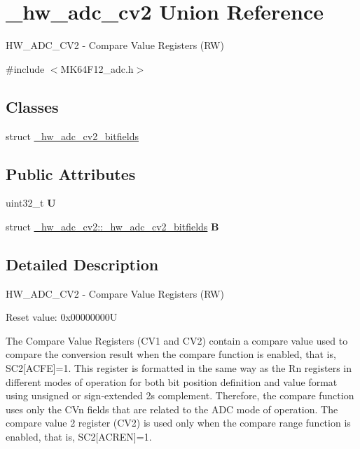\hypertarget{union__hw__adc__cv2}{}\section{\+\_\+hw\+\_\+adc\+\_\+cv2 Union Reference}
\label{union__hw__adc__cv2}


H\+W\+\_\+\+A\+D\+C\+\_\+\+C\+V2 -\/ Compare Value Registers (RW)  




{\ttfamily \#include $<$M\+K64\+F12\+\_\+adc.\+h$>$}

\subsection*{Classes}
\begin{DoxyCompactItemize}
\item 
struct \hyperlink{struct__hw__adc__cv2_1_1__hw__adc__cv2__bitfields}{\+\_\+hw\+\_\+adc\+\_\+cv2\+\_\+bitfields}
\end{DoxyCompactItemize}
\subsection*{Public Attributes}
\begin{DoxyCompactItemize}
\item 
uint32\+\_\+t {\bfseries U}\hypertarget{union__hw__adc__cv2_a550644e6f8c8a095a2f2f3d162b535a2}{}\label{union__hw__adc__cv2_a550644e6f8c8a095a2f2f3d162b535a2}

\item 
struct \hyperlink{struct__hw__adc__cv2_1_1__hw__adc__cv2__bitfields}{\+\_\+hw\+\_\+adc\+\_\+cv2\+::\+\_\+hw\+\_\+adc\+\_\+cv2\+\_\+bitfields} {\bfseries B}\hypertarget{union__hw__adc__cv2_a8289eb90e76e9fb57aca5e8c92130693}{}\label{union__hw__adc__cv2_a8289eb90e76e9fb57aca5e8c92130693}

\end{DoxyCompactItemize}


\subsection{Detailed Description}
H\+W\+\_\+\+A\+D\+C\+\_\+\+C\+V2 -\/ Compare Value Registers (RW) 

Reset value\+: 0x00000000U

The Compare Value Registers (C\+V1 and C\+V2) contain a compare value used to compare the conversion result when the compare function is enabled, that is, S\+C2\mbox{[}A\+C\+FE\mbox{]}=1. This register is formatted in the same way as the Rn registers in different modes of operation for both bit position definition and value format using unsigned or sign-\/extended 2\textquotesingle{}s complement. Therefore, the compare function uses only the C\+Vn fields that are related to the A\+DC mode of operation. The compare value 2 register (C\+V2) is used only when the compare range function is enabled, that is, S\+C2\mbox{[}A\+C\+R\+EN\mbox{]}=1. 

